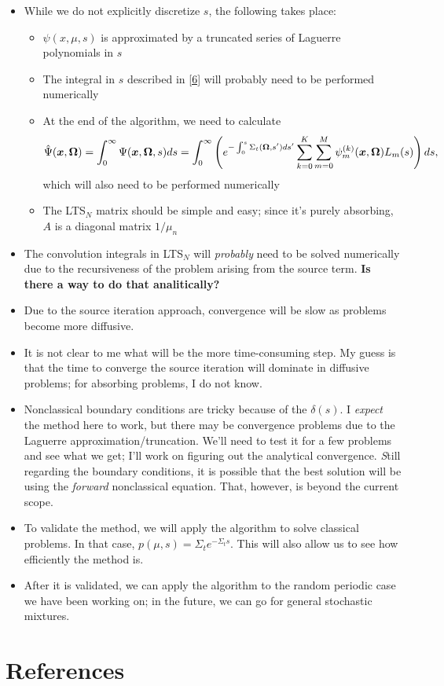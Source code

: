 \documentclass[preprint,12pt]{elsarticle}
\newcommand{\ux}{{\bm x}}
\newcommand{\uom}{{\bf \Omega}}
\begin{document}
\begin{itemize}
\item While we do not explicitly discretize $s$, the following takes place:
\begin{itemize}
\item $\psi(x,\mu,s)$ is approximated by a truncated series of Laguerre polynomials in $s$
\item The integral in $s$ described in \cref{6} will probably need to be performed numerically
\item At the end of the algorithm, we need to calculate
$$\hat\Psi(\ux,\uom) = \int_0^\infty \Psi(\ux,\uom,s)ds =  \int_0^{\infty} \left(e^{-\int_0^s\Sigma_t(\uom,s')ds'}\sum_{k=0}^{K}\sum_{m=0}^M\psi^{(k)}_m(\ux,\uom)L_m(s)\right)ds,$$
which will also need to be performed numerically 
\item The LTS$_N$ matrix should be simple and easy; since it's purely absorbing, $A$ is a diagonal matrix $1/\mu_n$
\end{itemize}
\item The convolution integrals in LTS$_N$ will \textit{probably} need to be solved numerically due to the recursiveness of the problem arising from the source term. \textbf{Is there a way to do that analitically?}
\item Due to the source iteration approach, convergence will be slow as problems become more diffusive.
\item It is not clear to me what will be the more time-consuming step. My guess is that the time to converge the source iteration will dominate in diffusive problems; for absorbing problems, I do not know.   
\item Nonclassical boundary conditions are tricky because of the $\delta(s)$. I \textit{expect} the method here to work, but there may be convergence problems due to the Laguerre approximation/truncation. We'll need to test it for a few problems and see what we get; I'll work on figuring out the analytical convergence.
\textit Still regarding the boundary conditions, it is possible that the best solution will be using the \textit{forward} nonclassical equation. That, however, is beyond the current scope.
\item To validate the method, we will apply the algorithm to solve classical problems. In that case, $p(\mu,s) = \Sigma_te^{-\Sigma_t s}$. This will also allow us to see how efficiently the method is.
\item After it is validated, we can apply the algorithm to the random periodic case we have been working on; in the future, we can go for general stochastic mixtures.
\end{itemize}

\section*{References}


\end{document}

